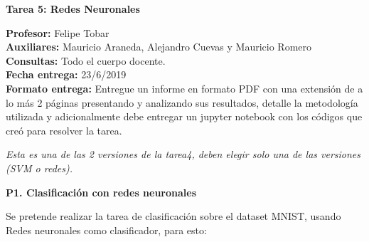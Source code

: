 \documentclass[11pt,letterpaper]{article}
\begin{document}
\pagestyle{fancy}
\fancyhf{}

\begin{center}
\large {\textbf{Tarea 5: Redes Neuronales}}\\
\end{center}
\textbf{Profesor:} Felipe Tobar\\ 
\textbf{Auxiliares:} Mauricio Araneda, Alejandro Cuevas y Mauricio Romero \\
\textbf{Consultas:} Todo el cuerpo docente.\\
\textbf{Fecha entrega:} 23/6/2019 \\
\textbf{Formato entrega:} Entregue un informe en formato PDF con una extensión de a lo más 2 páginas presentando y analizando sus resultados, detalle la metodología utilizada y adicionalmente debe entregar un jupyter notebook con los códigos que creó para resolver la tarea.

\begin{center}
    \textit{Esta es una de las 2 versiones de la tarea4, deben elegir solo una de las versiones (SVM o redes).}
\end{center}

\noindent\textbf{P1. Clasificación con redes neuronales}
\vspace{5 mm}

Se pretende realizar la tarea de clasificación sobre el dataset MNIST, usando Redes neuronales como clasificador, para esto:
    
\end{document}
